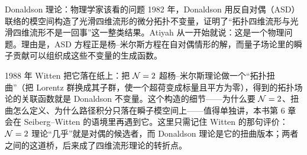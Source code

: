 \begin{pizhu}{Donaldson 理论：物理学家该看的问题}
1982 年，Donaldson 用反自对偶（ASD）联络的模空间构造了光滑四维流形的微分拓扑不变量，证明了“拓扑四维流形与光滑四维流形不是一回事”这一整类结果。Atiyah 从一开始就说：这是一个物理问题。理由是，ASD 方程正是杨--米尔斯方程在自对偶情形的解，而量子场论里的瞬子贡献可以组织成这些不变量的生成函数。

1988 年 Witten 把它落在纸上：把 $\mathcal{N}=2$ 超杨--米尔斯理论做一个“拓扑扭曲”（把 Lorentz 群换成其子群，使一个超荷变成标量且平方为零），得到的拓扑场论的关联函数就是 Donaldson 不变量。这个构造的细节——为什么要 $\mathcal{N}=2$、扭曲怎么定义、为什么路径积分只落在瞬子模空间上——值得单独讲，本书第 6 章会在 Seiberg--Witten 的语境里再遇到它。这里只需记住 Witten 的那句评价：$\mathcal{N}=2$ 理论“几乎”就是对偶的候选者，而 Donaldson 理论是它的扭曲版本；两者之间的这道桥，后来成了四维流形理论的转折点。
\end{pizhu}
